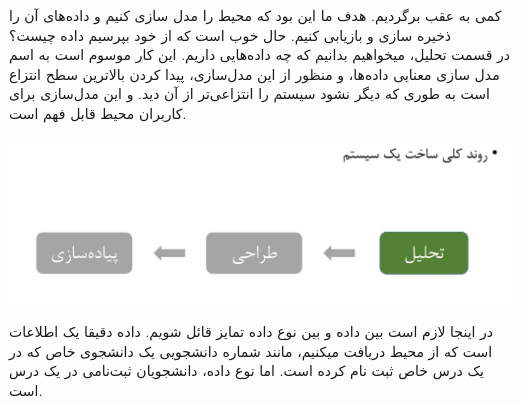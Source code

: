 \large{
کمی به عقب برگردیم. هدف ما این بود که محیط را مدل سازی کنیم و داده‌های آن را ذخیره سازی و بازیابی کنیم. حال خوب است که از خود بپرسیم داده چیست؟
}
\\
\large{
در قسمت تحلیل، میخواهیم بدانیم که چه داده‌هایی داریم. این کار موسوم است به اسم مدل سازی معنایی داده‌ها، و منظور از این مدل‌سازی،‌ پیدا کردن بالاترین سطح انتزاع است به طوری که دیگر نشود سیستم را انتزاعی‌تر از آن دید. و این مدل‌سازی برای کاربران محیط قابل فهم است.
}

\graphicspath{ {./files/} }


\includegraphics[scale=0.5]{2}


\large{
در اینجا لازم است بین داده و بین نوع داده تمایز قائل شویم. داده دقیقا یک اطلاعات است که از محیط دریافت میکنیم، مانند شماره دانشجویی یک دانشجوی خاص که در یک درس خاص ثبت نام کرده است. اما نوع داده، دانشجویان ثبت‌نامی در یک درس است.
}